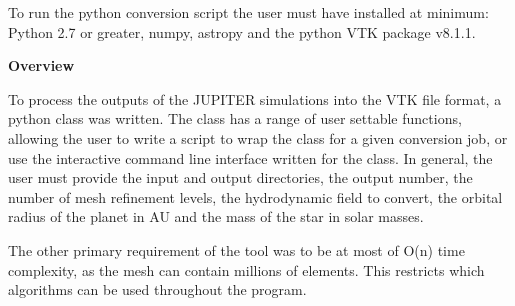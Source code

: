 \documentclass[twocolumn]{aastex62}
\begin{document}
To run the python conversion script the user must have installed at minimum: Python 2.7 or greater, numpy, astropy and the python VTK package v8.1.1.

\textbf{Overview}

To process the outputs of the JUPITER simulations into the VTK file format, a python class was written. 
The class has a range of user settable functions, allowing the user to write a script to wrap the class for a given conversion job, or use the interactive command line interface written for the class.
In general, the user must provide the input and output directories, the output number, the number of mesh refinement levels, the hydrodynamic field to convert, the orbital radius of the planet in AU and the mass of the star in solar masses.

The other primary requirement of the tool was to be at most of O(n) time complexity, as the mesh can contain millions of elements. This restricts which algorithms can be used throughout the program.
\end{document}

